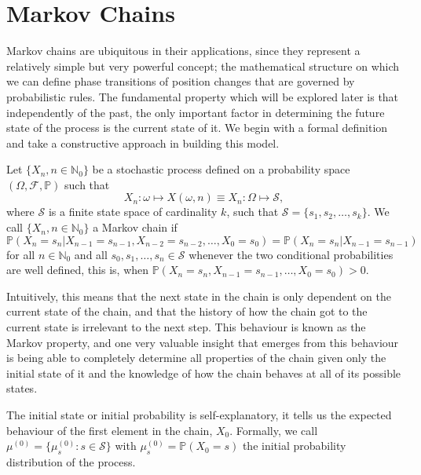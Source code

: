 \section{Markov Chains}

Markov chains are ubiquitous in their applications, since they represent a relatively simple but very powerful concept; the mathematical structure on which we can define phase transitions of position changes that are governed by probabilistic rules. The fundamental property which will be explored later is that independently of the past, the only important factor in determining the future state of the process is the current state of it. We begin with a formal definition and take a constructive approach in building this model. 

\begin{definition}
	Let $\{ X_n, n \in \mathbb{N}_0 \}$ be a stochastic process defined on a probability space $(\Omega, \mathcal{F}, \mathbb{P})$ such that
	\[ X_n: \omega \mapsto X(\omega, n) \equiv X_n : \Omega \mapsto \mathcal{S}, \]
	where $\mathcal{S}$ is a finite state space of cardinality $k$, such that $\mathcal{S} = \{ s_1, s_2, \ldots , s_k \}$. 
	We call $\{ X_n, n \in \mathbb{N}_0\}$ a Markov chain if 
	\[ \mathbb{P}(X_{n} = s_{n} | X_{n-1} = s_{n-1}, X_{n-2} = s_{n-2} , \ldots , X_0 = s_0 ) = \mathbb{P}(X_{n} = s_{n} | X_{n-1} = s_{n-1}) \]
	for all $n \in \mathbb{N}_0$ and all $s_0, s_1, \ldots , s_{n} \in \mathcal{S}$ whenever the two conditional probabilities are well defined, this is, when $\mathbb{P}(X_{n} = s_{n}, X_{n-1} = s_{n-1}, \ldots , X_0 = s_0) > 0$. 
\end{definition}

Intuitively, this means that the next state in the chain is only dependent on the current state of the chain, and that the history of how the chain got to the current state is irrelevant to the next step. 
This behaviour is known as the Markov property, and one very valuable insight that emerges from this behaviour is being able to completely determine all properties of the chain given only the initial state of it and the knowledge of how the chain behaves at all of its possible states. 

The initial state or initial probability is self-explanatory, it tells us the expected behaviour of the first element in the chain, $X_0$. Formally, we call $\mu^{(0)} = \{ \mu_s^{(0)} : s \in \mathcal{S} \}$ with $\mu_s^{(0)} = \mathbb{P}(X_0 = s)$ the initial probability distribution of the process. 

